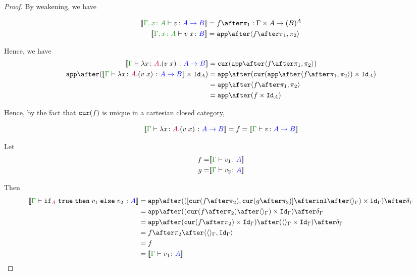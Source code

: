 \documentclass{report}
\begin{document}
\begin{framed}
\begin{proof}
        By weakening, we have
        
        \begin{align*}
            \deno{\typerelation{\gax}{v}{\ab}} & = f \after \p : \G \times A \rightarrow (B)^A \\
            \deno{\typerelation{\gax}{\apply{v}{x}}{B}} & = \app\after\pr{f \after \p}{\pp}
        \end{align*}
        
        Hence, we have 
        \begin{align}
                \deno{\gtyperelation{\lam{x}{A}{(\apply{v}{x})}}{\ab}} & = \cur{\app\after\pr{f \after \p}{\pp}}\\
                \app\after(\deno{\gtyperelation{\lam{x}{A}{(\apply{v}{x})}}{\ab}} \times \Id{A}) & = \app \after(\cur{\app\after\pr{f \after \p}{\pp}}\times \Id{A})\\
                & = \app \after\pr{f\after\p}{\pp}\\
                & = \app\after(f\times\Id{A})
        \end{align}
        
        Hence, by the fact that $\texttt{cur}(f)$ is unique in a cartesian closed category, 
        
        \begin{equation}
            \deno{\gtyperelation{\lam{x}{A}{(\apply{v}{x})}}{\ab}} = f =\deno{\gtyperelation{v}{\ab}}
        \end{equation}
        
        \case{\eqiftrue}
        Let
        \begin{align*}
            f = &\deno{\gtyperelation{v_1}{ A}}\\
            g = &\deno{\gtyperelation{v_2}{ A}}\\
        \end{align*}
        
        Then
        \begin{equation}
            \begin{split}
                \deno{\gtyperelation{\pifthenelse{A}{\t}{v_1}{v_2}}{ A}} & = \ifMorph{\inl\after\term{\G}}{f}{g} \\
                & = \app\after((\cur{f\after\pp}\after\term{\G})\times\idg)\after\diag{\G}\\
                & = \app\after(\cur{f\after\pp}\times\idg)\after(\term{\G}\times\idg)\after\diag{\G}\\
                & = f\after\pp\after\pr{\term{\G}}{\idg}\\
                & = f \\
                & = \deno{\gtyperelation{v_1}{ A}}\\
            \end{split}
        \end{equation}
        

\end{proof}
\end{framed}
\end{document}
